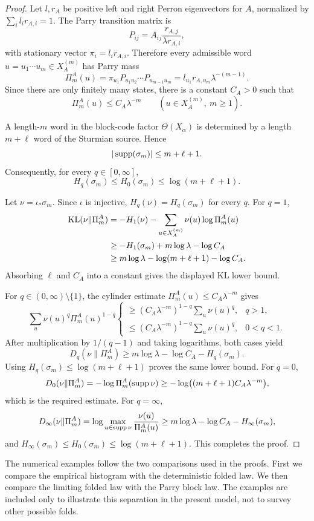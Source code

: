 \begin{proof}
Let \(l,r_A\) be positive left and right Perron eigenvectors for \(A\),
normalized by \(\sum_i l_ir_{A,i}=1\).  The Parry transition matrix is
\[
P_{ij}=A_{ij}\frac{r_{A,j}}{\lambda r_{A,i}},
\]
with stationary vector \(\pi_i=l_ir_{A,i}\).  Therefore every admissible
word \(u=u_1\cdots u_m\in X_A^{(m)}\) has Parry mass
\[
\Pi_m^A(u)
=
\pi_{u_1}P_{u_1u_2}\cdots P_{u_{m-1}u_m}
=
l_{u_1}r_{A,u_m}\lambda^{-(m-1)}.
\]
Since there are only finitely many states, there is a constant \(C_A>0\) such
that
\[
\Pi_m^A(u)\le C_A\lambda^{-m}
\qquad (u\in X_A^{(m)},\ m\ge1).
\]

A length-\(m\) word in the block-code factor \(\Theta(X_\alpha)\) is
determined by a length \(m+\ell\) word of the Sturmian source.  Hence
\[
|\operatorname{supp}(\sigma_m)|\le m+\ell+1.
\]
Consequently, for every \(q\in[0,\infty]\),
\[
H_q(\sigma_m)\le H_0(\sigma_m)\le \log(m+\ell+1).
\]

Let \(\nu=\iota_*\sigma_m\).  Since \(\iota\) is injective,
\(H_q(\nu)=H_q(\sigma_m)\) for every \(q\).  For \(q=1\),
\[
\begin{aligned}
\operatorname{KL}(\nu\|\Pi_m^A)
&=
-H_1(\nu)-\sum_{u\in X_A^{(m)}}\nu(u)\log \Pi_m^A(u)\\
&\ge
-H_1(\sigma_m)+m\log\lambda-\log C_A\\
&\ge
m\log\lambda-\log(m+\ell+1)-\log C_A.
\end{aligned}
\]
Absorbing \(\ell\) and \(C_A\) into a constant gives the displayed KL lower
bound.

For \(q\in(0,\infty)\setminus\{1\}\), the cylinder estimate
\(\Pi_m^A(u)\le C_A\lambda^{-m}\) gives
\[
\sum_u \nu(u)^q\Pi_m^A(u)^{1-q}
\begin{cases}
\ge (C_A\lambda^{-m})^{1-q}\sum_u\nu(u)^q, & q>1,\\
\le (C_A\lambda^{-m})^{1-q}\sum_u\nu(u)^q, & 0<q<1.
\end{cases}
\]
After multiplication by \(1/(q-1)\) and taking logarithms, both cases yield
\[
D_q(\nu\|\Pi_m^A)
\ge
m\log\lambda-\log C_A-H_q(\sigma_m).
\]
Using \(H_q(\sigma_m)\le \log(m+\ell+1)\) proves the same lower bound.  For
\(q=0\),
\[
D_0(\nu\|\Pi_m^A)
=-\log\Pi_m^A(\operatorname{supp}\nu)
\ge
-\log\bigl((m+\ell+1)C_A\lambda^{-m}\bigr),
\]
which is the required estimate.  For \(q=\infty\),
\[
D_\infty(\nu\|\Pi_m^A)
=
\log\max_{u\in\operatorname{supp}\nu}\frac{\nu(u)}{\Pi_m^A(u)}
\ge
m\log\lambda-\log C_A-H_\infty(\sigma_m),
\]
and \(H_\infty(\sigma_m)\le H_0(\sigma_m)\le\log(m+\ell+1)\).  This completes
the proof.
\end{proof}

\begin{remark}
\label{rem:numerical-interpretation}
The numerical examples follow the two comparisons used in the proofs.  First
we compare the empirical histogram with the deterministic folded law.  We then
compare the limiting folded law with the Parry block law.  The examples are
included only to illustrate this separation in the present model, not to
survey other possible folds.
\end{remark}
